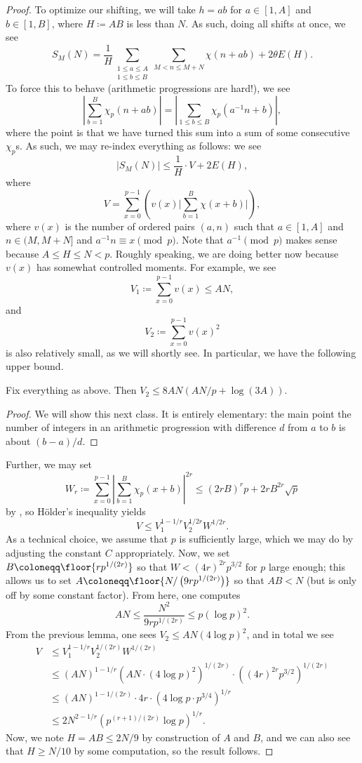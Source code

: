 \documentclass[../notes.tex]{subfiles}
\begin{document}
\begin{proof}
	To optimize our shifting, we will take $h=ab$ for $a\in[1,A]$ and $b\in[1,B]$, where $H\coloneqq AB$ is less than $N$. As such, doing all shifts at once, we see
	\[S_M(N)=\frac1H\sum_{\substack{1\le a\le A\\1\le b\le B}}\sum_{M<n\le M+N}\chi(n+ab)+2\theta E(H).\]
	To force this to behave (arithmetic progressions are hard!), we see
	\[\left|\sum_{b=1}^B\chi_p(n+ab)\right|=\left|\sum_{1\le b\le B}\chi_p\left(a^{-1}n+b\right)\right|,\]
	where the point is that we have turned this sum into a sum of some consecutive $\chi_p$s. As such, we may re-index everything as follows: we see
	\[|S_M(N)|\le\frac1H\cdot V+2E(H),\]
	where
	\[V=\sum_{x=0}^{p-1}\left(v(x)\Bigg|\sum_{b=1}^B\chi(x+b)\Bigg|\right),\]
	where $v(x)$ is the number of ordered pairs $(a,n)$ such that $a\in[1,A]$ and $n\in(M,M+N]$ and $a^{-1}n\equiv x\pmod p$. Note that $a^{-1}\pmod p$ makes sense because $A\le H\le N<p$. Roughly speaking, we are doing better now because $v(x)$ has somewhat controlled moments. For example, we see
	\[V_1\coloneqq\sum_{x=0}^{p-1}v(x)\le AN,\]
	and
	\[V_2\coloneqq\sum_{x=0}^{p-1}v(x)^2\]
	is also relatively small, as we will shortly see. In particular, we have the following upper bound.
	\begin{lemma}
		Fix everything as above. Then $V_2\le 8AN(AN/p+\log(3A))$.
	\end{lemma}
	\begin{proof}
		We will show this next class. It is entirely elementary: the main point the number of integers in an arithmetic progression with difference $d$ from $a$ to $b$ is about $(b-a)/d$.
	\end{proof}
	Further, we may set
	\[W_r\coloneqq\sum_{x=0}^{p-1}\left|\sum_{b=1}^B\chi_p(x+b)\right|^{2r}\le(2rB)^rp+2rB^{2r}\sqrt p\]
	by , so H\"older's inequality yields
	\[V\le V_1^{1-1/r}V_2^{1/2r}W^{1/2r}.\]
	As a technical choice, we assume that $p$ is sufficiently large, which we may do by adjusting the constant $C$ appropriately. Now, we set $B\coloneqq\floor{rp^{1/(2r)}}$ so that $W<(4r)^{2r}p^{3/2}$ for $p$ large enough; this allows us to set $A\coloneqq\floor{N/\left(9rp^{1/(2r)}\right)}$ so that $AB<N$ (but is only off by some constant factor). From here, one computes
	\[AN\le\frac{N^2}{9rp^{1/(2r)}}\le p(\log p)^2.\]
	From the previous lemma, one sees $V_2\le AN(4\log p)^2$, and in total we see
	\begin{align*}
		V&\le V_1^{1-1/r}V_2^{1/(2r)}W^{1/(2r)} \\
		&\le (AN)^{1-1/r}\left(AN\cdot(4\log p)^2\right)^{1/(2r)}\cdot\left((4r)^{2r}p^{3/2}\right)^{1/(2r)} \\
		&\le (AN)^{1-1/(2r)}\cdot4r\cdot\left(4\log p\cdot p^{3/4}\right)^{1/r} \\
		&\le 2N^{2-1/r}\left(p^{(r+1)/(2r)}\log p\right)^{1/r}.
	\end{align*}
	Now, we note $H=AB\le2N/9$ by construction of $A$ and $B$, and we can also see that $H\ge N/10$ by some computation, so the result follows.
\end{proof}
\end{document}
